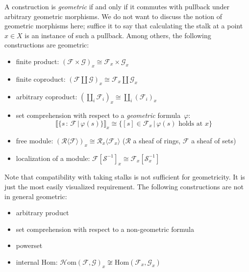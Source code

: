 \documentclass[10pt,reqno,a4paper]{amsbook}
\theoremstyle{definition}
\theoremstyle{plain}
\theoremstyle{remark}
\newcommand{\F}{\mathcal{F}}
\renewcommand{\G}{\mathcal{G}}
\newcommand{\R}{\mathcal{R}}
\renewcommand{\S}{\mathcal{S}}
\newcommand{\Hom}{\mathrm{Hom}}
\newcommand{\HOM}{\mathcal{H}\mathrm{om}}
\newcommand{\?}{\,{:}\,}
\renewcommand{\_}{\mathpunct{.}\,}
\newcommand{\brak}[1]{{\llbracket{#1}\rrbracket}}
\begin{document}
A construction is \emph{geometric} if and only if it commutes with pullback
under arbitrary geometric morphisms. We do not want to discuss the notion of
geometric morphisms here; suffice it to say that calculating the stalk at a
point~$x \in X$ is an instance of such a pullback. Among others, the following
constructions are geometric:
\begin{itemize}
\item finite product: $(\F \times \G)_x \cong \F_x \times \G_x$
\item finite coproduct: $(\F \amalg \G)_x \cong \F_x \amalg \G_x$
\item arbitrary coproduct: $(\coprod_i \F_i)_x \cong \coprod_i (\F_i)_x$
\item set comprehension with respect to a \emph{geometric} formula~$\varphi$:
\[ \brak{\{ s\?\F \,|\, \varphi(s) \}}_x \cong \{ [s]\in\F_x \,|\,
\text{$\varphi(s)$ holds at $x$} \} \]
\item free module: $(\R\langle \F \rangle)_x \cong \R_x\langle \F_x
\rangle$ ($\R$ a sheaf of rings, $\F$ a sheaf of sets)
\item localization of a module: $\F[\S^{-1}]_x \cong \F_x[\S_x^{-1}]$
\end{itemize}
Note that compatibility with taking stalks is not sufficient for geometricity.
It is just the most easily visualized requirement.
The following constructions are not in general geometric:
\begin{itemize}
\item arbitrary product
\item set comprehension with respect to a non-geometric formula
\item powerset
\item internal Hom: $\HOM(\F,\G)_x \not\cong \Hom(\F_x,\G_x)$
\end{itemize}
\end{document}
